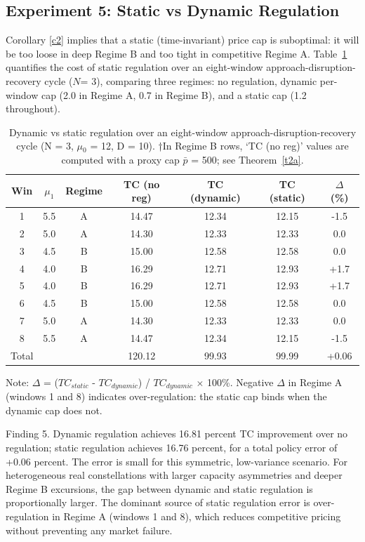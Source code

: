 \documentclass[review,3p,authoryear]{elsarticle}
\begin{document}
\subsection{Experiment 5: Static vs Dynamic Regulation}
\label{sec6.5}

Corollary \ref{c2} implies that a static (time-invariant) price cap is suboptimal: it will be too loose in deep Regime B and too tight in competitive Regime A. Table~\ref{tab:5} quantifies the cost of static regulation over an eight-window approach-disruption-recovery cycle ($N$= 3), comparing three regimes: no regulation, dynamic per-window cap (2.0 in Regime A, 0.7 in Regime B), and a static cap (1.2 throughout).

\begin{table}[!ht]
\centering
\caption{Dynamic vs static regulation over an eight-window approach-disruption-recovery cycle (N = 3, \ensuremath{\mu}\ensuremath{_{0}} = 12, D = 10). †In Regime B rows, `TC (no reg)' values are computed with a proxy cap \ensuremath{\bar{p}} = 500; see Theorem~\ref{t2a}.}
\label{tab:5}
\begin{tabular}{@{}ccccccc@{}}
\toprule
\textbf{Win} & \textbf{$\mu_1$} & \textbf{Regime} & \textbf{TC (no reg)} & \textbf{TC (dynamic)} & \textbf{TC (static)} & \textbf{$\Delta$ (\%)} \\ \midrule
1 & 5.5 & A & 14.47 & 12.34 & 12.15 & -1.5 \\
2 & 5.0 & A & 14.30 & 12.33 & 12.33 & 0.0 \\
3 & 4.5 & B & 15.00 & 12.58 & 12.58 & 0.0 \\
4 & 4.0 & B & 16.29 & 12.71 & 12.93 & +1.7 \\
5 & 4.0 & B & 16.29 & 12.71 & 12.93 & +1.7 \\
6 & 4.5 & B & 15.00 & 12.58 & 12.58 & 0.0 \\
7 & 5.0 & A & 14.30 & 12.33 & 12.33 & 0.0 \\
8 & 5.5 & A & 14.47 & 12.34 & 12.15 & -1.5 \\
Total &  &  & 120.12 & 99.93 & 99.99 & +0.06 \\ \bottomrule
\end{tabular}
\end{table}
Note: \ensuremath{\Delta} = ($TC_{static}$ - $TC_{dynamic}$) / $TC_{dynamic}$ \ensuremath{\times} 100\%. Negative \ensuremath{\Delta} in Regime A (windows 1 and 8) indicates over-regulation: the static cap binds when the dynamic cap does not.

Finding 5. Dynamic regulation achieves 16.81 percent TC improvement over no regulation; static regulation achieves 16.76 percent, for a total policy error of +0.06 percent. The error is small for this symmetric, low-variance scenario. For heterogeneous real constellations with larger capacity asymmetries and deeper Regime B excursions, the gap between dynamic and static regulation is proportionally larger. The dominant source of static regulation error is over-regulation in Regime A (windows 1 and 8), which reduces competitive pricing without preventing any market failure.
\end{document}
